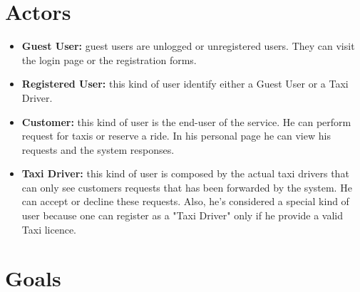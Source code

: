 	\section{Actors}
		\begin{itemize}
		  \item \textbf{Guest User:}\label{sec:normaluser} guest users are unlogged or unregistered users. They can visit the login page or the registration forms.

		  \item \textbf{Registered User:}\label{sec:ruser} this kind of user identify either a Guest User or a Taxi Driver.

		  \item \textbf{Customer:}\label{sec:customer} this kind of user is the end-user of the service. He can perform request for taxis or reserve a ride. In his personal page he can view his requests and the system responses.

		  \item \textbf{Taxi Driver:}\label{sec:tdriver} this kind of user is composed by the actual taxi drivers that can only see customers requests that has been forwarded by the system. He can accept or decline these requests. Also, he's considered a special kind of user because one can register as a "Taxi Driver" only if he provide a valid Taxi licence.
		\end{itemize}

	\section{Goals}

